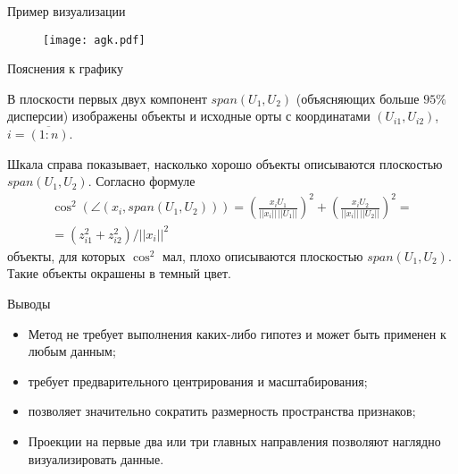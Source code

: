 \documentclass[unicode, notheorems, pdf]{beamer}
\begin{document}
%
\begin{frame}{Пример визуализации}
	\begin{figure}\begin{center}
		\texttt{[image: agk.pdf]}
	\end{center}\end{figure}
\end{frame}
%
\begin{frame}{Пояснения к графику}
	
	В плоскости первых двух компонент $span(U_1,U_2)$ (объясняющих больше $95\%$ дисперсии) изображены объекты и исходные орты с координатами $(U_{i1}, U_{i2})$, $i=\overline{(1:n)}$.

	\vspace{.5cm}
	Шкала справа показывает, насколько хорошо объекты описываются плоскостью $span(U_1,U_2)$. Согласно формуле
	\begin{eqnarray*}
	&\cos^2(\angle(x_i, span(U_1,U_2))) = \left(\frac{x_iU_1}{||x_i||\,||U_1||}\right)^2 + \left(\frac{x_iU_2}{||x_i||\,||U_2||}\right)^2 =&\\
	&=(z_{i1}^2+z_{i2}^2)/||x_i||^2&
	\end{eqnarray*}
	объекты, для которых $\cos^2$ мал, плохо описываются плоскостью $span(U_1,U_2)$. Такие объекты окрашены в темный цвет.
\end{frame}
%
\begin{frame}{Выводы}

	\begin{itemize}
		\item Метод не требует выполнения каких-либо гипотез и может быть применен к любым данным;

		\vspace{.25cm}
		\item требует предварительного центрирования и масштабирования;

		\vspace{.25cm}
		\item позволяет значительно сократить размерность пространства признаков;

		\vspace{.25cm}
		\item Проекции на первые два или три главных направления позволяют наглядно визуализировать данные.


	\end{itemize}
\end{frame}
\end{document}
